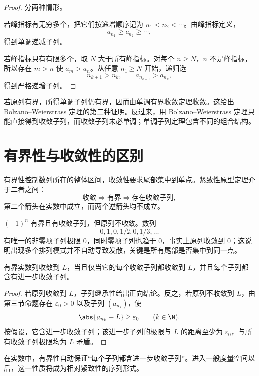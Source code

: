 \begin{proof}
分两种情形。

若峰指标有无穷多个，把它们按递增顺序记为
\(n_1<n_2<\cdots\)。由峰指标定义，
\[
 a_{n_1}\ge a_{n_2}\ge\cdots,
\]
得到单调递减子列。

若峰指标只有有限多个，取 \(N\) 大于所有峰指标。对每个 \(n\ge N\)，\(n\) 不是峰指标，所以存在 \(m>n\) 使 \(a_m>a_n\)。从任意 \(n_1\ge N\) 开始，递归选
\[
 n_{k+1}>n_k,\qquad a_{n_{k+1}}>a_{n_k},
\]
得到严格递增子列。
\end{proof}

若原列有界，所得单调子列仍有界，因而由单调有界收敛定理收敛。这给出 Bolzano--Weierstrass 定理的第二种证明。反过来，用 Bolzano--Weierstrass 定理只能直接得到收敛子列，而收敛子列未必单调；单调子列定理包含不同的组合结构。

\section{有界性与收敛性的区别}

有界性控制数列所在的整体区间，收敛性要求尾部集中到单点。紧致性原型定理介于二者之间：
\[
 \text{收敛}\Longrightarrow\text{有界}
 \Longrightarrow\text{存在收敛子列},
\]
第二个箭头在实数中成立，而两个逆箭头均不成立。

\begin{counterexample}
\((-1)^n\) 有界且有收敛子列，但原列不收敛。数列
\[
 0,1,0,1/2,0,1/3,\ldots
\]
有唯一的非零项子列极限 \(0\)，同时零项子列也趋于 \(0\)，事实上原列收敛到 \(0\)；这说明出现多个排列模式并不自动导致发散，关键是所有尾部是否集中到同一点。
\end{counterexample}

\begin{proposition}
有界实数列收敛到 \(L\)，当且仅当它的每个收敛子列都收敛到 \(L\)，并且每个子列都含有进一步收敛子列。
\end{proposition}

\begin{proof}
若原列收敛到 \(L\)，子列继承性给出正向结论。反之，若原列不收敛到 \(L\)，由第三节命题存在 \(\varepsilon_0>0\) 以及子列 \((a_{n_k})\)，使
\[
 \abs{a_{n_k}-L}\ge\varepsilon_0\qquad(k\in\N).
\]
按假设，它含进一步收敛子列；该进一步子列的极限与 \(L\) 的距离至少为 \(\varepsilon_0\)，与所有收敛子列极限均为 \(L\) 矛盾。
\end{proof}

在实数中，有界性自动保证“每个子列都含进一步收敛子列”。进入一般度量空间以后，这一性质将成为相对紧致性的序列形式。


